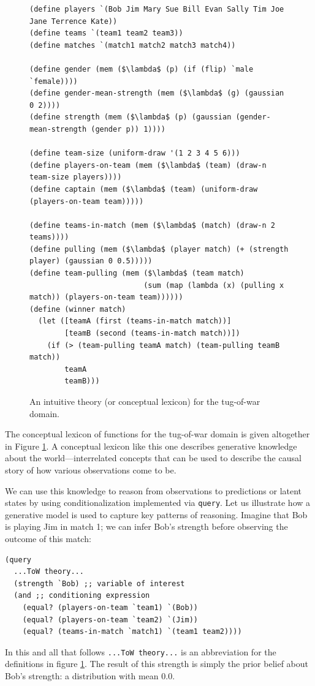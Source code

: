\documentclass[12pt]{article}
\begin{document}
 \begin{figure}[tbh]
\begin{center}
 \begin{lstlisting}[mathescape]
(define players `(Bob Jim Mary Sue Bill Evan Sally Tim Joe Jane Terrence Kate))
(define teams `(team1 team2 team3))
(define matches `(match1 match2 match3 match4))

(define gender (mem ($\lambda$ (p) (if (flip) `male `female))))
(define gender-mean-strength (mem ($\lambda$ (g) (gaussian 0 2))))
(define strength (mem ($\lambda$ (p) (gaussian (gender-mean-strength (gender p)) 1))))

(define team-size (uniform-draw '(1 2 3 4 5 6)))
(define players-on-team (mem ($\lambda$ (team) (draw-n team-size players))))
(define captain (mem ($\lambda$ (team) (uniform-draw (players-on-team team)))))

(define teams-in-match (mem ($\lambda$ (match) (draw-n 2 teams))))
(define pulling (mem ($\lambda$ (player match) (+ (strength player) (gaussian 0 0.5)))))
(define team-pulling (mem ($\lambda$ (team match) 
                          (sum (map (lambda (x) (pulling x match)) (players-on-team team))))))
(define (winner match) 
  (let ([teamA (first (teams-in-match match))]
        [teamB (second (teams-in-match match))])
    (if (> (team-pulling teamA match) (team-pulling teamB match))
        teamA
        teamB)))
\end{lstlisting}
\caption{An intuitive theory (or conceptual lexicon) for the tug-of-war domain.}
\label{theory}
\end{center}
\end{figure}  

The conceptual lexicon of functions for the tug-of-war domain is given altogether in Figure \ref{theory}.
A conceptual lexicon like this one describes generative knowledge about the world---interrelated concepts that can be used to describe the causal story of how various observations come to be. 

We can use this knowledge to reason from observations to predictions or latent states by using conditionalization implemented via \lstinline{query}. 
Let us illustrate how a generative model is used to capture key patterns of reasoning. 
Imagine that Bob is playing Jim in match 1; we can infer Bob's strength before observing the outcome of this match:
\begin{lstlisting}[mathescape]
(query
  ...ToW theory...
  (strength `Bob) ;; variable of interest
  (and ;; conditioning expression 
    (equal? (players-on-team `team1) `(Bob))
    (equal? (players-on-team `team2) `(Jim))
    (equal? (teams-in-match `match1) `(team1 team2))))
\end{lstlisting}
In this and all that follows \lstinline{...ToW theory...} is an abbreviation for the definitions in figure \ref{theory}. 
The result of this strength is simply the prior belief about Bob's strength: a distribution with mean 0.0.
\end{document}
